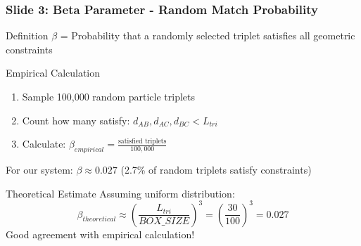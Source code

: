 \documentclass[a4paper,8pt]{beamer}
\begin{document}
\begin{frame}
\frametitle{Slide 3: Beta Parameter - Random Match Probability}
\begin{block}{Definition}
    $\beta$ = Probability that a randomly selected triplet satisfies all geometric constraints
\end{block}

\begin{block}{Empirical Calculation}
    \begin{enumerate}
        \item Sample 100,000 random particle triplets
        \item Count how many satisfy: $d_{AB}, d_{AC}, d_{BC} < L_{tri}$
        \item Calculate: $\beta_{empirical} = \frac{\text{satisfied triplets}}{100,000}$
    \end{enumerate}
    
    \vspace{0.3cm}
    For our system: \textbf{$\beta \approx 0.027$} (2.7\% of random triplets satisfy constraints)
\end{block}

\begin{block}{Theoretical Estimate}
    Assuming uniform distribution:
    \begin{equation*}
        \beta_{theoretical} \approx \left(\frac{L_{tri}}{BOX\_SIZE}\right)^3 = \left(\frac{30}{100}\right)^3 = 0.027
    \end{equation*}
    Good agreement with empirical calculation!
\end{block}
\end{frame}
\end{document}
